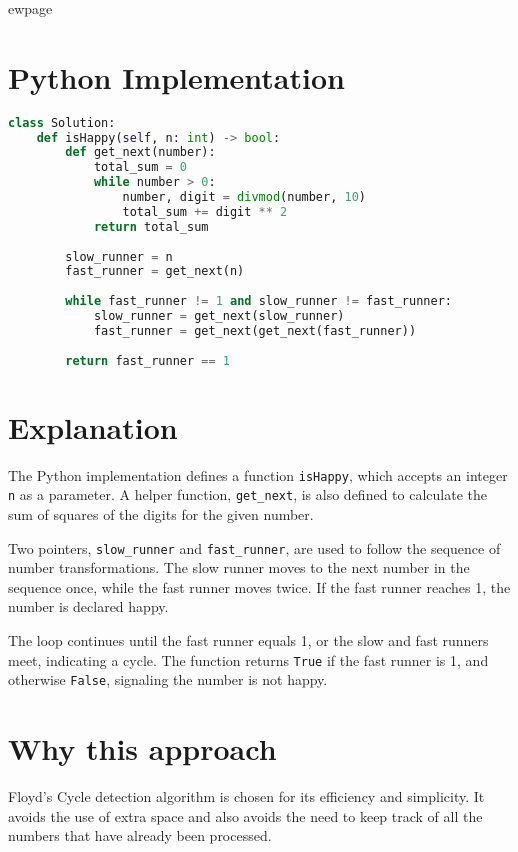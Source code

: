 ewpage
\section*{Python Implementation}

\begin{fullwidth}
\begin{lstlisting}[language=Python]
class Solution:
    def isHappy(self, n: int) -> bool:
        def get_next(number):
            total_sum = 0
            while number > 0:
                number, digit = divmod(number, 10)
                total_sum += digit ** 2
            return total_sum
        
        slow_runner = n
        fast_runner = get_next(n)
        
        while fast_runner != 1 and slow_runner != fast_runner:
            slow_runner = get_next(slow_runner)
            fast_runner = get_next(get_next(fast_runner))
        
        return fast_runner == 1
\end{lstlisting}

\end{fullwidth}

\section*{Explanation}

The Python implementation defines a function \texttt{isHappy}, which accepts an integer \texttt{n} as a parameter. A helper function, \texttt{get\_next}, is also defined to calculate the sum of squares of the digits for the given number.

Two pointers, \texttt{slow\_runner} and \texttt{fast\_runner}, are used to follow the sequence of number transformations. The slow runner moves to the next number in the sequence once, while the fast runner moves twice. If the fast runner reaches 1, the number is declared happy.

The loop continues until the fast runner equals 1, or the slow and fast runners meet, indicating a cycle. The function returns \texttt{True} if the fast runner is 1, and otherwise \texttt{False}, signaling the number is not happy.

\section*{Why this approach}
Floyd's Cycle detection algorithm is chosen for its efficiency and simplicity. It avoids the use of extra space and also avoids the need to keep track of all the numbers that have already been processed.

